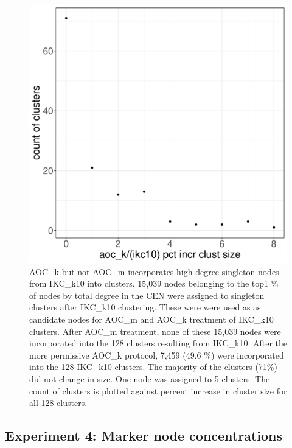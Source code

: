 \documentclass[12pt, oneside]{article}   	%
\begin{document}
\begin{figure}[H]
	\centering
	 \includegraphics[width=0.7\linewidth]{singletons.pdf} 
\caption{AOC\_k but not AOC\_m incorporates high-degree singleton nodes from IKC\_k10 into clusters. 15,039 nodes belonging to the top1 \% of nodes by total degree in the CEN were assigned to singleton clusters after IKC\_k10 clustering. These were were used as as candidate nodes for AOC\_m and AOC\_k treatment of IKC\_k10 clusters. After AOC\_m treatment, none of these 15,039 nodes were incorporated into the 128 clusters resulting from  IKC\_k10. After the more permissive AOC\_k protocol, 7,459 (49.6 \%) were incorporated into the 128 IKC\_k10 clusters. The majority of the clusters (71\%) did not change in size. One node was assigned to 5 clusters. The count of clusters is plotted against percent increase in cluster size for all 128 clusters.}
\label{fig:alt-singleton}
\end{figure}


\subsection{Experiment 4: Marker node concentrations}
\end{document}
